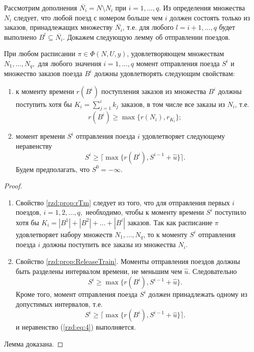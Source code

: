 Рассмотрим дополнения $\overline{N_i} = N \setminus N_i$ при $i =1, \dots, q$. Из определения множества $N_i$ следует, что любой поезд с номером больше чем $i$ должен состоять только из заказов, принадлежащих множеству $\overline{N_i}$, т.е. для любого $l = i+1, \dots, q$ будет выполнено $ B^l \subseteq \overline{N_i}$.
Докажем следующую лемму об отправлении поездов.

\begin{lemma}\label{rzd:lm:1}
При любом расписании $\pi \in \Phi(N,U,y)$, удовлетворяющем множествам $N_1, \dots, N_q,$ для любого значения $i =1, \dots, q$ момент отправления поезда $S^i$ и множество заказов поезда $B^i$ должны удовлетворять следующим свойствам:
  \begin{enumerate}
  \item к моменту времени $r(B^i)$ поступления заказов из множества $B^i$ должны поступить хотя бы $K_i = \sum\limits_{j=1}^i k_j$ заказов, в том числе все заказы из $N_i$, т.е. \label{rzd:prop:rTm}
  $$r(B^i) \geq \max\{r(N_i), r_{K_i}\};$$
  \item момент времени $S^i$ отправления поезда $i$ удовлетворяет следующему неравенству\label{rzd:prop:ReleaseTrain}
  \begin{equation} \label{rzd:eq:4}
    S^i \geq \lceil \max \{r(B^i), S^{i-1} + \widehat{u}\} \rceil.
  \end{equation}
Будем предполагать, что $S^0 = -\infty.$
\end{enumerate}
\end{lemma}

\begin{proof}
\begin{enumerate}
\item Свойство \ref{rzd:prop:rTm} следует из того, что для отправления первых $i$ поездов, $i=1, 2, \dots, q,$ необходимо, чтобы к моменту времени $S^i$ поступило хотя бы $K_i = |B^1| + |B^2| +\dots + |B^i|$ заказов. Так как расписание $\pi$ удовлетворяет набору множеств $N_1, \dots, N_q$, то к моменту $S^i$ отправления поезда $i$ должны поступить все заказы из множества $N_i$.
\item Свойство \ref{rzd:prop:ReleaseTrain}. Моменты отправления поездов должны быть разделены интервалом времени, не меньшим чем $\widehat{u}$. Следовательно
$$S^i \geq \max\{r(B^i), S^{i-1} + \widehat{u}\}.$$
Кроме того, момент отправления поезда $S^i$ должен принадлежать одному из допустимых интервалов, т.е.
$$S^i \geq \lceil \max\{r(B^i), S^{i-1} + \widehat{u}\} \rceil.$$
и неравенство (\ref{rzd:eq:4}) выполняется.
\end{enumerate}
Лемма доказана.
\end{proof}


